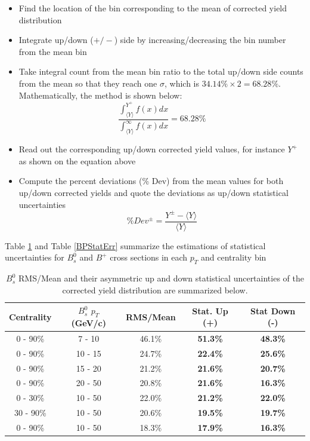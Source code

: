\begin{itemize}
\item Find the location of the bin corresponding to the mean of corrected yield distribution 
\item Integrate up/down ($+/-$) side by increasing/decreasing the bin number from the mean bin 
\item Take integral count from the mean bin ratio to the total up/down side counts from the mean so that they reach one $\sigma$, which is $34.14\% \times 2 = 68.28\%$. Mathematically, the method is shown below:
\begin{equation}
\frac{\int_{\langle Y \rangle}^{Y^+} f(x) dx }{\int_{\langle Y \rangle}^{\infty} f(x) dx} = 68.28\%
\end{equation}
\item Read out the corresponding up/down corrected yield values, for instance $Y^+$ as shown on the equation above
\item Compute the percent deviations (\% Dev) from the mean values for both up/down corrected yields and quote the deviations as up/down statistical uncertainties 
\begin{equation}
\% Dev^\pm =\frac{Y^\pm - \langle Y \rangle}{\langle Y \rangle}
\end{equation}
\end{itemize}

Table \ref{BsStatErr} and Table \ref{BPStatErr} summarize the estimations of statistical uncertainties for $B^0_s$ and $B^+$ cross sections in each $p_T$ and centrality bin

\begin{table}[h]
\begin{center}
\caption{$B^0_s$ RMS/Mean and their asymmetric up and down statistical uncertainties of the corrected yield distribution are summarized below.}
\vspace{1em}
\label{BsStatErr}
  \begin{tabular}{| c | c |c | c| c|}
    \hline
     Centrality &  $B^0_s$ $p_T$ (GeV/c) & RMS/Mean  & Stat. Up (+) & Stat Down (-)  \\
    \hline
    \hline
0 - 90\% & 7 - 10 & 46.1\%  &  \textbf{51.3\% }  &  \textbf{48.3\% }   \\ 
0 - 90\% & 10 - 15 & 24.7\% & \textbf{22.4\% }  & \textbf{25.6\%}  \\ 
0 - 90\% & 15 - 20 & 21.2\% & \textbf{21.6\% }  & \textbf{20.7\%}   \\ 
0 - 90\% & 20 - 50 & 20.8\% & \textbf{21.6\% }  &  \textbf{16.3\%}   \\ 
0 - 30\% & 10 - 50 & 22.0\% &  \textbf{21.2\% }  &  \textbf{22.0\% } \\ 
30 - 90\% & 10 - 50 & 20.6\% & \textbf{19.5\% }  &  \textbf{19.7\% }  \\ 
0 - 90\% & 10 - 50 & 18.3\% & \textbf{17.9\% }  & \textbf{16.3\% }  \\ 
    \hline
    \hline
\end{tabular}
\end{center}
\end{table}


